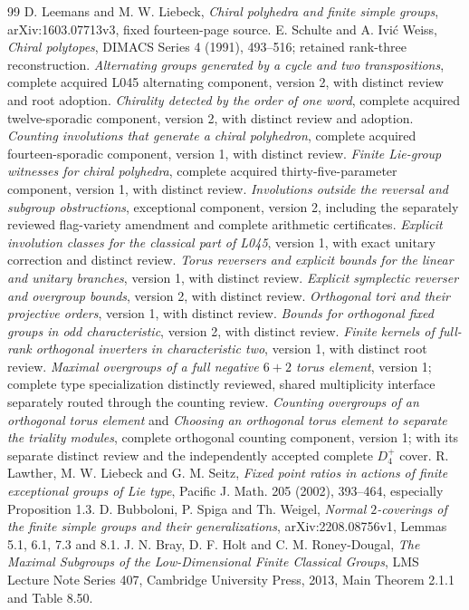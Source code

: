 \documentclass[11pt,a4paper]{article}
\begin{document}
\begin{thebibliography}{99}\small
{} D. Leemans and M. W. Liebeck, \emph{Chiral polyhedra and finite
simple groups}, arXiv:1603.07713v3, fixed fourteen-page source.
 E. Schulte and A. Ivi\'c Weiss, \emph{Chiral polytopes},
DIMACS Series 4 (1991), 493--516; retained rank-three reconstruction.
 \emph{Alternating groups generated by a cycle and two transpositions}, complete acquired
L045 alternating component, version 2, with distinct review and root adoption.
 \emph{Chirality detected by the order of one word}, complete
acquired twelve-sporadic component, version 2, with distinct review and adoption.
 \emph{Counting involutions that generate a chiral polyhedron},
complete acquired fourteen-sporadic component, version 1, with distinct review.
 \emph{Finite Lie-group witnesses for chiral polyhedra}, complete
acquired thirty-five-parameter component, version 1, with distinct review.
 \emph{Involutions outside the reversal and subgroup
obstructions}, exceptional component, version 2, including the separately
reviewed flag-variety amendment and complete arithmetic certificates.
 \emph{Explicit involution classes for the classical part of L045},
version 1, with exact unitary correction and distinct review.
 \emph{Torus reversers and explicit bounds for the linear and
unitary branches}, version 1, with distinct review.
 \emph{Explicit symplectic reverser and overgroup bounds},
version 2, with distinct review.
 \emph{Orthogonal tori and their projective orders}, version 1, with distinct review.
 \emph{Bounds for orthogonal fixed groups in odd characteristic},
version 2, with distinct review.
 \emph{Finite kernels of full-rank orthogonal inverters in characteristic two},
version 1, with distinct root review.
 \emph{Maximal overgroups of a full negative $6+2$ torus element},
version 1; complete type specialization distinctly reviewed, shared multiplicity
interface separately routed through the counting review.
 \emph{Counting overgroups of an orthogonal torus element}
and \emph{Choosing an orthogonal torus element to separate the triality modules}, complete orthogonal counting component, version 1;
with its separate distinct review and the independently accepted complete $D_4^+$ cover.
 R. Lawther, M. W. Liebeck and G. M. Seitz,
\emph{Fixed point ratios in actions of finite exceptional groups of Lie type},
Pacific J. Math. 205 (2002), 393--464, especially Proposition 1.3.
 D. Bubboloni, P. Spiga and Th. Weigel,
\emph{Normal $2$-coverings of the finite simple groups and their generalizations},
arXiv:2208.08756v1, Lemmas 5.1, 6.1, 7.3 and 8.1.
 J. N. Bray, D. F. Holt and C. M. Roney-Dougal,
\emph{The Maximal Subgroups of the Low-Dimensional Finite Classical Groups},
LMS Lecture Note Series 407, Cambridge University Press, 2013,
Main Theorem 2.1.1 and Table 8.50.
\end{thebibliography}
\end{document}
